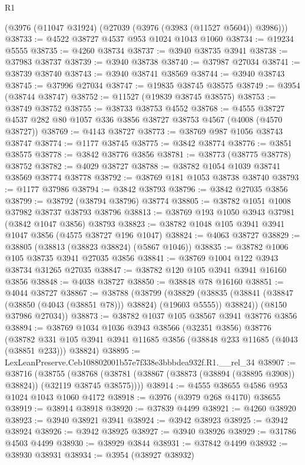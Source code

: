 \begin{lexlean}{R1}
\begin{coremodule}
    (@3976 (@11047 @31924) (@27039 (@3976 (@3983 (@11527 @5604)) @3986)))
@38733 := @4522 @38727 @4537 @953 @1024 @1043 @1060
@38734 := @19234 @5555
@38735 := @4260 @38734
@38737 := @3940 @38735 @3941
@38738 := @37983 @38737
@38739 := @3940 @38738
@38740 := @37987 @27034
@38741 := @38739 @38740
@38743 := @3940 @38741 @38569
@38744 := @3940 @38743
@38745 := @37996 @27034
@38747 := @19835 @38745 @38575
@38749 := @3954 (@38744 @38747)
@38752 := @11527 (@19839 @38745 @38575)
@38753 := @38749 @38752
@38755 := @38733 @38753 @4552
@38768 := @4555 @38727 @4537 @282 @80 @1057 @336 @3856 @38727 @38753 @4567 (@4008 (@4570 @38727))
@38769 := @4143 @38727
@38773 := @38769 @987 @1056 @38743 @38747
@38774 := @1177 @38745
@38775 := @3842 @38774
@38776 := @3851 @38575
@38778 := @3842 @38776 @3856
@38781 := @38773 (@38775 @38778) @38752
@38782 := @4029 @38727
@38788 := @38782 @1054 @1039 @38741 @38569 @38774 @38778
@38792 := @38769 @181 @1053 @38738 @38740
@38793 := @1177 @37986
@38794 := @3842 @38793
@38796 := @3842 @27035 @3856
@38799 := @38792 (@38794 @38796) @38774
@38805 := @38782 @1051 @1008 @37982 @38737 @38793 @38796
@38813 := @38769 @193 @1050 @3943 @37981 (@3842 @1047 @3856) @38793
@38823 := @38782 @1048 @105 @3941 @3941 @1047 @3856 (@4575 @38727 @196 @1047)
@38824 := @4063 @38727
@38829 := @38805 (@38813 (@38823 @38824) (@5867 @1046))
@38835 := @38782 @1006 @105 @38735 @3941 @27035 @3856
@38841 := @38769 @1004 @122 @3943 @38734 @31265 @27035
@38847 := @38782 @120 @105 @3941 @3941 @16160 @3856
@38848 := @4038 @38727
@38850 := @38848 @78 @16160
@38851 := @4044 @38727
@38867 := @38788
    (@38799
      (@38829 (@38835 (@38841 (@38847 (@38850 (@4043 (@38851 @78))) @38824) (@19603 @5555)) @38824))
      (@8150 @37986 @27034))
@38873 := @38782 @1037 @105 @38567 @3941 @38776 @3856
@38894 := @38769
    @1034
    @1036
    @3943
    @38566
    (@32351 @3856)
    @38776
    (@38782 @331 @105 @3941 @3941 @11685 @3856 (@38848 @233 @11685 (@4043 (@38851 @233))) @38824)
@38895 := LexLeanPreserve.Ceb108802001b57e7f338e3bbbdea932f.R1.__rel_34
@38907 := @38716
    (@38755
      (@38768 (@38781 (@38867 (@38873 (@38894 (@38895 @3908)) @38824)) (@32119 @38745 @38575))))
@38914 := @4555 @38655 @4586 @953 @1024 @1043 @1060 @4172
@38918 := @3976 (@3979 @268 @4170) @38655
@38919 := @38914 @38918
@38920 := @37839 @4499
@38921 := @4260 @38920
@38923 := @3940 @38921 @3941
@38924 := @3942 @38923
@38925 := @3942 @38924
@38926 := @3942 @38925
@38927 := @3940 @38926
@38929 := @31786 @4503 @4499
@38930 := @38929 @3844
@38931 := @37842 @4499
@38932 := @38930 @38931
@38934 := @3954 (@38927 @38932)

\end{coremodule}
\end{lexlean}
